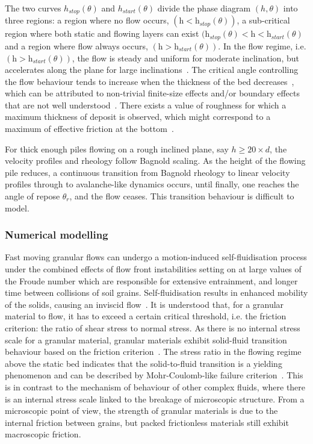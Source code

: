 The two curves $h_{stop}(\theta)$ and $h_{start}(\theta)$ divide the phase 
diagram $(h,\theta)$ into three regions: a region where no flow occurs, 
$(\textit{h}<\textit{h}_{\textit{stop}}(\theta))$, a sub-critical region where 
both static and flowing layers can exist $(\textit{h}_{\textit{stop}}(\theta) < 
\textit{h} < \textit{h}_{\textit{start}}(\theta)$ and a region where flow 
always occurs, $(\textit{h}>\textit{h}_{\textit{start}}(\theta))$. In the flow 
regime, i.e. $(\textit{h}>\textit{h}_{\textit{start}}(\theta))$, the flow is 
steady and uniform for moderate inclination, but accelerates along the plane 
for large inclinations~\citep{Midi2004}. The critical angle controlling the 
flow behaviour tends to increase when the thickness of the bed 
decreases~\citep{Pouliquen2002a,Daerr1999}, which can be attributed to 
non-trivial finite-size effects and/or boundary effects that are not well 
understood~\citep{Forterre2008}. There exists a value of roughness for which a 
maximum thickness of deposit is observed, which might correspond to a maximum
of effective friction at the bottom~\citep{Midi2004}.

For thick enough piles flowing on a rough inclined plane, say $h \ge 20 \times 
d$, the velocity profiles and rheology follow Bagnold scaling. As the height of 
the flowing pile reduces, a continuous transition from Bagnold rheology to
linear velocity profiles through to avalanche-like dynamics occurs, until 
finally, one reaches the angle of repose $\theta_r$, and the
flow ceases. This transition behaviour is difficult to model. 

\subsubsection{Numerical modelling}

Fast moving granular flows can undergo a motion-induced self-fluidisation 
process under the combined effects of flow front instabilities setting on at 
large values of the Froude number which are responsible for extensive 
entrainment, and longer time between collisions of soil grains. 
Self-fluidisation results in enhanced mobility of the solids, causing an 
inviscid flow~\citep{Bareschino2008}. It is understood that, for a granular 
material to flow, it has to exceed a certain critical threshold, i.e. the 
friction criterion: the ratio of shear stress to normal stress. As there is no 
internal stress scale for a granular material, granular materials exhibit 
solid-fluid transition behaviour based on the friction 
criterion~\citep{Forterre2008}. The stress ratio in the flowing regime above 
the static bed indicates that the solid-to-fluid transition is a yielding 
phenomenon and can be described by Mohr-Coulomb-like failure 
criterion~\citep{Zhang1992}. This is in contrast to the mechanism of behaviour 
of other complex fluids, where there is an internal stress scale linked to the 
breakage of microscopic structure. From a microscopic point of view, the 
strength of granular materials is due to the internal friction between 
grains, but packed frictionless materials still exhibit macroscopic friction.

